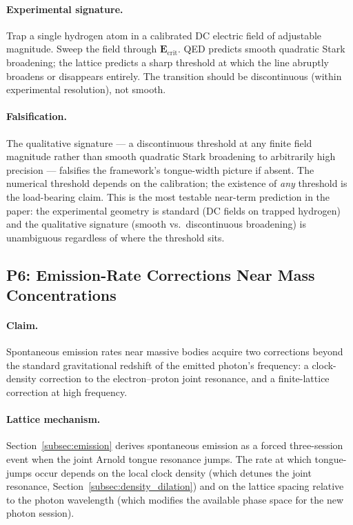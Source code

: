 \paragraph{Experimental signature.}
Trap a single hydrogen atom in a calibrated DC electric field of
adjustable magnitude. Sweep the field through $\mathbf{E}_\text{crit}$.
QED predicts smooth quadratic Stark broadening; the lattice
predicts a sharp threshold at which the line abruptly broadens or
disappears entirely. The transition should be discontinuous
(within experimental resolution), not smooth.

\paragraph{Falsification.}
The qualitative signature --- a discontinuous threshold at any
finite field magnitude rather than smooth quadratic Stark broadening
to arbitrarily high precision --- falsifies the framework's
tongue-width picture if absent. The numerical threshold depends on
the calibration; the existence of \emph{any} threshold is the
load-bearing claim. This is the most testable near-term prediction
in the paper: the experimental geometry is standard (DC fields on
trapped hydrogen) and the qualitative signature (smooth vs.\
discontinuous broadening) is unambiguous regardless of where the
threshold sits.

\subsection{P6: Emission-Rate Corrections Near Mass Concentrations}
\label{subsec:p6_emission_correction}

\paragraph{Claim.}
Spontaneous emission rates near massive bodies acquire two
corrections beyond the standard gravitational redshift of the
emitted photon's frequency: a clock-density correction to the
electron--proton joint resonance, and a finite-lattice correction at
high frequency.

\paragraph{Lattice mechanism.}
Section~\ref{subsec:emission} derives spontaneous emission as a
forced three-session event when the joint Arnold tongue resonance
jumps. The rate at which tongue-jumps occur depends on the local
clock density (which detunes the joint resonance,
Section~\ref{subsec:density_dilation}) and on the lattice spacing
relative to the photon wavelength (which modifies the available
phase space for the new photon session).

